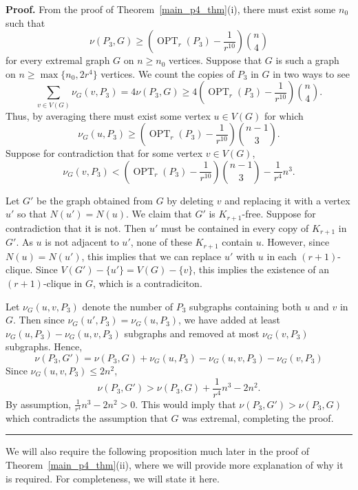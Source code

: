 \documentclass[12pt]{article}
\DeclareMathOperator{\OPT}{OPT}
\renewenvironment{proof}[1][Proof]{\textbf{#1.} }{\ \rule{0.5em}{0.5em}}
\begin{document}
\begin{proof}
From the proof of Theorem~\ref{main_p4_thm}(i), there must exist some $n_0$ such that 
\[ 
\nu(P_3,G) \geq \left( \OPT_r(P_3) - \frac{1}{r^{10}} \right)\binom{n}{4} \]
for every extremal graph $G$ on $n \geq n_0$ vertices. Suppose that $G$ is such
a graph on $n \geq \max \{n_0,2r^4\}$ vertices. We count the copies of $P_3$ in $G$
in two ways to see
\[ 
\sum\limits_{v \in V(G)} \nu_G(v,P_3) = 4 \nu(P_3,G) \geq 4 \left( \OPT_r(P_3) - \frac{1}{r^{10}} \right)\binom{n}{4}.
\]
Thus, by averaging there must exist some vertex $u \in V(G)$ for which
\[ 
\nu_G(u,P_3) \geq \left( \OPT_r(P_3) - \frac{1}{r^{10}} \right)\binom{n-1}{3}. 
\]
Suppose for contradiction that for some vertex $v \in V(G)$,
\[ \nu_G(v,P_3) < \left( \OPT_r(P_3) - \frac{1}{r^{10}} \right)\binom{n-1}{3} - \frac{1}{r^4}n^3.\]

Let $G'$ be the graph obtained from $G$ by deleting $v$ and replacing it with a
vertex $u'$ so that $N(u') = N(u)$. We claim that $G'$ is $K_{r+1}$-free.
Suppose for contradiction that it is not. Then $u'$ must be contained in every
copy of $K_{r+1}$ in $G'$. As $u$ is not adjacent to $u'$, none of these
$K_{r+1}$ contain $u$. However, since $N(u) = N(u')$, this implies that we
can replace $u'$ with $u$ in each $(r+1)$-clique. Since $V(G') - \{u'\} = V(G) -
\{v\}$, this implies the existence of an $(r+1)$-clique in $G$, which is a
contradiciton.

Let $\nu_G(u,v,P_3)$ denote the number of $P_3$ subgraphs containing both $u$ and $v$ in $G$. Then since $\nu_G(u',P_3) = \nu_G(u,P_3)$, we have added at least $\nu_G(u,P_3) -  \nu_G(u,v,P_3)$ subgraphs and removed at most $\nu_G(v,P_3)$ subgraphs. Hence,
\[
\nu(P_3,G') = \nu(P_3,G) + \nu_G(u,P_3) - \nu_G(u,v,P_3) - \nu_G(v,P_3)
\]
Since $\nu_G(u,v,P_3) \leq 2n^2$,
\[ 
\nu(P_3,G') > \nu(P_3,G) + \frac{1}{r^4}n^3 - 2n^2.
\]
By assumption, $\frac{1}{r^4}n^3 - 2n^2 > 0$. This would imply that $\nu(P_3,G') > \nu(P_3,G)$ which contradicts the assumption that $G$ was extremal, completing the proof.
\end{proof}

We will also require the following proposition much later in the proof of Theorem~\ref{main_p4_thm}(ii), where we will provide more explanation of why it is required. For completeness, we will state it here.  
\end{document}
